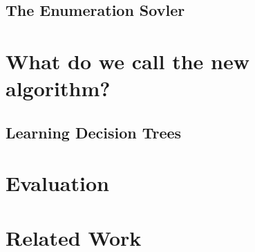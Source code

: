 \documentclass{llncs}
\begin{document}
\subsection{The Enumeration Sovler }
\label{sec:enumeration}

\section{What do we call the new algorithm?}
\label{sec:algo}

\subsection{Learning Decision Trees}
\label{sec:decision_trees}

\section{Evaluation}
\label{sec:evaluation}

\section{Related Work}
\label{sec:related_work}

\
\end{document}
